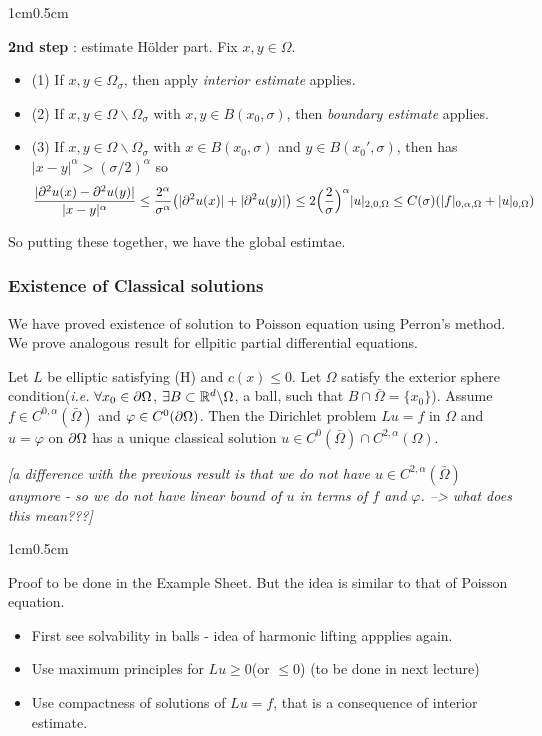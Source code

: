 \documentclass[12pt,a4paper]{article}
\newenvironment{proof}
{\begin{changemargin}{1cm}{0.5cm} 
	}%
	{\end{changemargin}
}
\renewenvironment{i}
{\begin{itemize} 
	}%
	{\end{itemize}
}
\newenvironment{p}
{\begin{proof} 
	}%
	{\end{proof}
}
\begin{document}
\begin{p}
\textbf{2nd step} : estimate H\"older part. Fix $x,y\in \Omega$.
\begin{i}
\item[(1)] If $x, y\in \Omega_{\sigma}$, then apply \emph{interior estimate} applies.
\item[(2)] If $x, y\in \Omega \backslash \Omega_{\sigma}$ with $x, y\in B(x_0, \sigma)$, then \emph{boundary estimate} applies.
\item[(3)] If $x, y\in \Omega \backslash \Omega_{\sigma}$ with $x\in B(x_0, \sigma)$ and $y \in B(x_0', \sigma)$, then has $|x-y|^{\alpha} > (\sigma /2)^{\alpha}$ so
\begin{align*}
\frac{|\partial^2 u(x) - \partial^2 u(y)|}{|x-y|^{\alpha}} \leq \frac{2^{\alpha}}{\sigma^{\alpha}} \big(|\partial^2 u(x)| + |\partial^2 u(y)| \big) \leq 2\Big(\frac{2}{\sigma} \Big)^{\alpha} |u|_{2, 0, \Omega} \leq C(\sigma)(|f|_{0, \alpha, \Omega} + |u|_{0, \Omega})
\end{align*}
\end{i}
So putting these together, we have the global estimtae.

\eop
\end{p}
\s

\subsubsection*{Existence of Classical solutions}

We have proved existence of solution to Poisson equation using Perron's method. We prove analogous result for ellpitic partial differential equations.
\s

\thm Let $L$ be elliptic satisfying (H) and $c(x) \leq 0$. Let $\Omega$ satisfy the exterior sphere condition(\textit{i.e.} $\forall x_0 \in \partial \Omega$, $\exists B \subset \mathbb{R}^d \backslash \Omega$, a ball, such that $B\cap \bar{\Omega} = \{x_0 \}$). Assume $f\in C^{0, \alpha}(\bar{\Omega})$ and $\varphi \in C^0(\partial \Omega)$. Then the Dirichlet problem $Lu =f$ in $\Omega$ and $u= \varphi$ on $\partial \Omega$ has a unique classical solution $u\in C^0(\bar{\Omega}) \cap C^{2, \alpha}(\Omega)$.

\emph{[a difference with the previous result is that we do not have $u \in C^{2, \alpha}(\bar{\Omega})$ anymore - so we do not have linear bound of $u$ in terms of $f$ and $\varphi$. --> what does this mean???]}
\begin{p}
\pf Proof to be done in the Example Sheet. But the idea is similar to that of Poisson equation.
\begin{i}
\item First see solvability in balls - idea of harmonic lifting appplies again. 
\item Use maximum principles for $Lu \geq 0$(or $\leq 0$) (to be done in next lecture)
\item Use compactness of solutions of $Lu =f$, that is a consequence of interior estimate.
\end{i} 
\end{p}
\s
\end{document}

